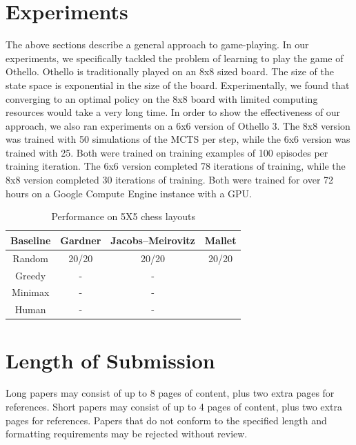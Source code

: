 \documentclass[11pt]{article}
\begin{document}
\section{Experiments}

The above sections describe a general approach to game-playing. In our experiments, we specifically tackled the problem of learning to play the game of Othello. Othello is traditionally played on an 8x8 sized board. The size of the state space is exponential in the size of the board. Experimentally, we found that converging to an optimal policy on the 8x8 board with limited computing resources would take a very long time. In order to show the effectiveness of our approach, we also ran experiments on a 6x6 version of Othello 3. The 8x8 version was trained with 50 simulations of the MCTS per step, while the 6x6 version was trained with 25. Both were trained on training examples of 100 episodes per training iteration. The 6x6 version completed 78 iterations of training, while the 8x8 version completed 30 iterations of training. Both were trained for over 72 hours on a Google Compute Engine instance with a GPU.


\begin{table}[h]
\begin{center}
\begin{tabular}{c c c c}
\hline \bf Baseline & \bf Gardner  & \bf Jacobs–Meirovitz & \bf Mallet \\ \hline
Random & 20/20 & 20/20 & 20/20 \\
Greedy & - & - &  \\
Minimax & - & - & \\
Human & - & - & \\

\hline
\end{tabular}
\end{center}
\caption{\label{font-table} Performance on 5X5 chess layouts }
\end{table}

\section{Length of Submission}
\label{sec:length}

Long papers may consist of up to 8 pages of content, plus two extra
pages for references. Short papers may consist of up to 4 pages of
content, plus two extra pages for references.  Papers that do not
conform to the specified length and formatting requirements may be
rejected without review.
\end{document}
